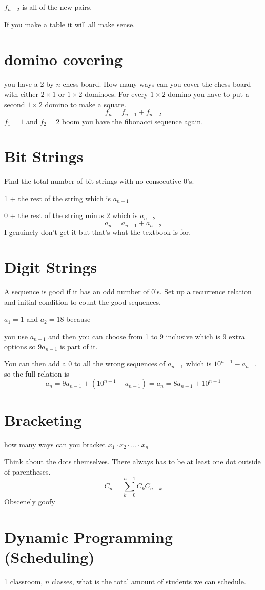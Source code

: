 \documentclass{report}
\begin{document}
 $f_{n-2}$ is all of the new pairs.

If you make a table it will all make sense.

\section{domino covering}
you have a 2 by $n$ chess board. How many ways can you cover the chess board with either $2 \times 1$ or $1 \times 2$ dominoes. For every $1 \times 2$ domino you have to put a second $1 \times 2$ domino to make a square.
 \[
 f_n = f_{n-1} + f_{n-2}
 \]
$f_1 = 1$ and $f_2 = 2$ boom you have the fibonacci sequence again.


\section{Bit Strings}
Find the total number of bit strings with no consecutive 0's.

1 + the rest of the string which is $a_{n-1}$

0 + the rest of the string minus 2 which is $a_{n-2}$
\[
a_n = a_{n-1} + a_{n-2}
\]
I genuinely don't get it but that's what the textbook is for.

\section{Digit Strings}
A sequence is good if it has an odd number of 0's. Set up a recurrence relation and initial condition to count the good sequences.

$a_1 = 1$ and $a_2 = 18$ because

you use $a_{n-1}$ and then you can choose from 1 to 9 inclusive which is 9 extra options so $9a_{n-1}$ is part of it.

You can then add a 0 to all the wrong sequences of $a_{n-1}$ which is $10^{n-1} - a_{n-1}$ so the full relation is
\[
a_n = 9a_{n-1} + (10^{n-1} - a_{n-1})
=
a_n = 8a_{n-1} + 10^{n-1} 
\]


\section{Bracketing}
how many ways can you bracket $x_1 \cdot x_2 \cdot \ldots \cdot x_n$

Think about the dots themselves. There always has to be at least one dot outside of parentheses.
\[
C_n = \sum_{k=0}^{n-1}C_kC_{n-k}
\]
Obscenely goofy

\section{Dynamic Programming (Scheduling)}
1 classroom, $n$ classes, what is the total amount of students we can schedule.
\end{document}
